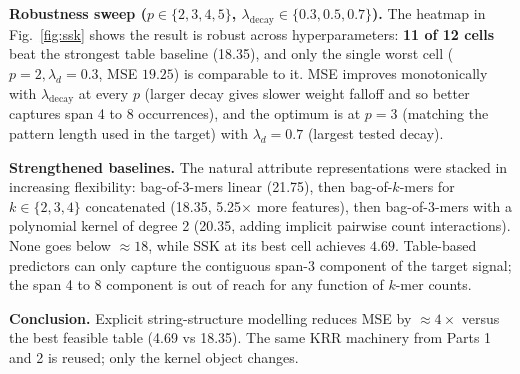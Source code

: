 \documentclass[10pt, a4paper]{article}
\begin{document}
\textbf{Robustness sweep ($p \in \{2,3,4,5\}$, $\lambda_{\mathrm{decay}} \in \{0.3, 0.5, 0.7\}$).} The heatmap in Fig.~\ref{fig:ssk} shows the result is robust across hyperparameters: \textbf{11 of 12 cells} beat the strongest table baseline (18.35), and only the single worst cell ($p=2, \lambda_d=0.3$, MSE $19.25$) is comparable to it. MSE improves monotonically with $\lambda_{\mathrm{decay}}$ at every $p$ (larger decay gives slower weight falloff and so better captures span 4 to 8 occurrences), and the optimum is at $p=3$ (matching the pattern length used in the target) with $\lambda_d = 0.7$ (largest tested decay).

\textbf{Strengthened baselines.} The natural attribute representations were stacked in increasing flexibility: bag-of-3-mers linear (21.75), then bag-of-$k$-mers for $k\in\{2,3,4\}$ concatenated (18.35, 5.25$\times$ more features), then bag-of-3-mers with a polynomial kernel of degree 2 (20.35, adding implicit pairwise count interactions). None goes below $\approx 18$, while SSK at its best cell achieves $4.69$. Table-based predictors can only capture the contiguous span-3 component of the target signal; the span 4 to 8 component is out of reach for any function of $k$-mer counts.

\textbf{Conclusion.} Explicit string-structure modelling reduces MSE by $\approx 4\times$ versus the best feasible table (4.69 vs 18.35). The same KRR machinery from Parts 1 and 2 is reused; only the kernel object changes.
\end{document}

